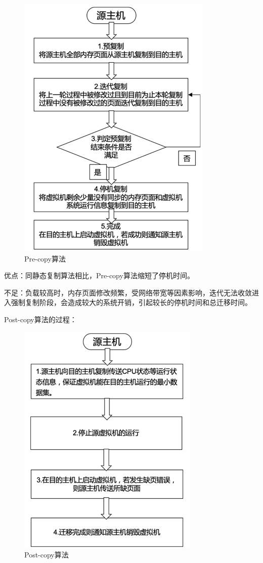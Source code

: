 \begin{figure}[htb]
  \centering
  \includegraphics{./Figure/IMG_Chap2_2.png}
  \caption{Pre-copy算法}\label{Fig:chap2_2}
\end{figure}

优点：同静态复制算法相比，Pre-copy算法缩短了停机时间。

不足：负载较高时，内存页面修改频繁，受网络带宽等因素影响，迭代无法收敛进入强制复制阶段，会造成较大的系统开销，引起较长的停机时间和总迁移时间。

Post-copy算法的过程：

\begin{figure}[htb]
  \centering
  \includegraphics{./Figure/IMG_Chap2_3.png}
  \caption{Post-copy算法}\label{Fig:chap2_3}
\end{figure}

